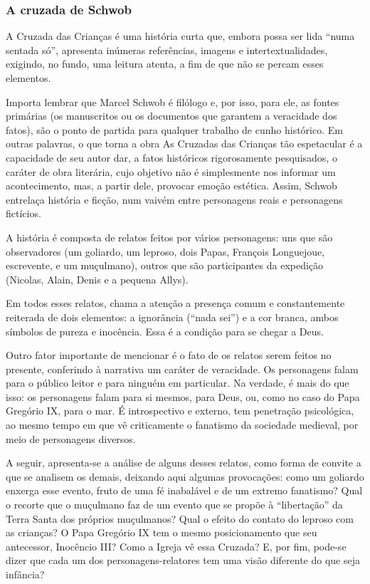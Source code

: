 \documentclass[12pt]{extarticle}
\begin{document}
\subsubsection{A cruzada de Schwob}

A Cruzada das Crianças é uma história curta que, embora possa ser lida
``numa sentada só'', apresenta inúmeras referências, imagens e
intertextualidades, exigindo, no fundo, uma leitura atenta, a fim de que
não se percam esses elementos.

Importa lembrar que Marcel Schwob é filólogo e, por isso, para ele, as
fontes primárias (os manuscritos ou os documentos que garantem a
veracidade dos fatos), são o ponto de partida para qualquer trabalho de
cunho histórico. Em outras palavras, o que torna a obra As Cruzadas das
Crianças tão espetacular é a capacidade de seu autor dar, a fatos
históricos rigorosamente pesquisados, o caráter de obra literária, cujo
objetivo não é simplesmente nos informar um acontecimento, mas, a partir
dele, provocar emoção estética. Assim, Schwob entrelaça história e
ficção, num vaivém entre personagens reais e personagens fictícios.

A história é composta de relatos feitos por vários personagens: uns que
são observadores (um goliardo, um leproso, dois Papas, François
Longuejoue, escrevente, e um muçulmano), outros que são participantes da
expedição (Nicolas, Alain, Denis e a pequena Allys).

Em todos esses relatos, chama a atenção a presença comum e
constantemente reiterada de dois elementos: a ignorância (``nada sei'')
e a cor branca, ambos símbolos de pureza e inocência. Essa é a condição
para se chegar a Deus.

Outro fator importante de mencionar é o fato de os relatos serem feitos
no presente, conferindo à narrativa um caráter de veracidade. Os
personagens falam para o público leitor e para ninguém em particular. Na
verdade, é mais do que isso: os personagens falam para si mesmos, para
Deus, ou, como no caso do Papa Gregório IX, para o mar. É introspectivo
e externo, tem penetração psicológica, ao mesmo tempo em que vê
criticamente o fanatismo da sociedade medieval, por meio de personagens
diversos.

A seguir, apresenta-se a análise de alguns desses relatos, como forma de
convite a que se analisem os demais, deixando aqui algumas provocações:
como um goliardo enxerga esse evento, fruto de uma fé inabalável e de um
extremo fanatismo? Qual o recorte que o muçulmano faz de um evento que
se propõe à ``libertação'' da Terra Santa dos próprios muçulmanos? Qual
o efeito do contato do leproso com as crianças? O Papa Gregório IX tem o
mesmo posicionamento que seu antecessor, Inocêncio III? Como a Igreja vê
essa Cruzada? E, por fim, pode-se dizer que cada um dos
personagens-relatores tem uma visão diferente do que seja infância?
\end{document}
